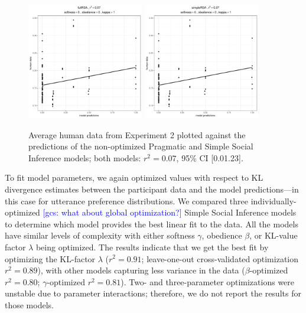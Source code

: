 \documentclass[10pt,a4paper]{article}
\newcommand{\gcs}[1]{\textcolor{blue}{[gcs: #1]}}
\begin{document}
\begin{figure}[ht]
	\centering
	\includegraphics[width=2in]{images/x3_m1.pdf}
	\includegraphics[width=2in]{images/x3_m7.pdf}
	\caption{Average human data from Experiment 2 plotted against the predictions of the non-optimized Pragmatic and Simple Social Inference models; both  models: $r^{2}=0.07$, 95\% CI [0.01.23].}\label{simple-full-x3}
\end{figure}



To fit model parameters, we again optimized values with respect to KL divergence estimates between the participant data and the model predictions---in this case for utterance preference distributions.  We compared three individually-optimized \gcs{what about global optimization?} Simple Social Inference models to determine which model provides the best linear fit to the data. All the models have similar levels of complexity with either softness $\gamma$, obedience $\beta$, or KL-value factor $\lambda$ being optimized. The results indicate that we get the best fit by optimizing the KL-factor $\lambda$ ($r^{2}=0.91$; leave-one-out cross-validated optimization $r^{2}=0.89$), with other models capturing less variance in the data ($\beta$-optimized $r^{2}=0.80$; $\gamma$-optimized $r^{2}=0.81$). Two- and three-parameter optimizations were unstable due to parameter interactions; therefore, we do not report the results for those models.
\end{document}
